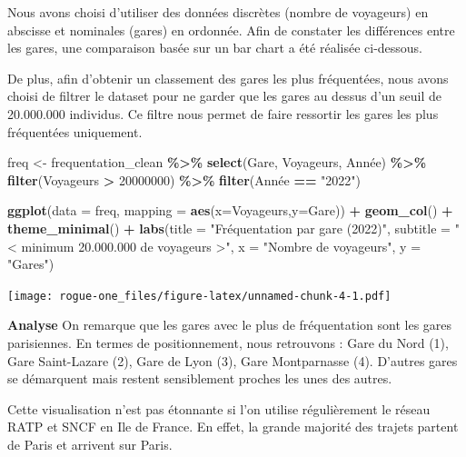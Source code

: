 \documentclass[
]{article}
\newenvironment{Shaded}{\begin{snugshade}}{\end{snugshade}}
\newcommand{\AttributeTok}[1]{\textcolor[rgb]{0.13,0.29,0.53}{#1}}
\newcommand{\DecValTok}[1]{\textcolor[rgb]{0.00,0.00,0.81}{#1}}
\newcommand{\FunctionTok}[1]{\textcolor[rgb]{0.13,0.29,0.53}{\textbf{#1}}}
\newcommand{\NormalTok}[1]{#1}
\newcommand{\OtherTok}[1]{\textcolor[rgb]{0.56,0.35,0.01}{#1}}
\newcommand{\SpecialCharTok}[1]{\textcolor[rgb]{0.81,0.36,0.00}{\textbf{#1}}}
\newcommand{\StringTok}[1]{\textcolor[rgb]{0.31,0.60,0.02}{#1}}
\begin{document}
Nous avons choisi d'utiliser des données discrètes (nombre de voyageurs)
en abscisse et nominales (gares) en ordonnée. Afin de constater les
différences entre les gares, une comparaison basée sur un bar chart a
été réalisée ci-dessous.

De plus, afin d'obtenir un classement des gares les plus fréquentées,
nous avons choisi de filtrer le dataset pour ne garder que les gares au
dessus d'un seuil de 20.000.000 individus. Ce filtre nous permet de
faire ressortir les gares les plus fréquentées uniquement.

\begin{Shaded}
\begin{Highlighting}[]
\NormalTok{freq }\OtherTok{\textless{}{-}}\NormalTok{ frequentation\_clean }\SpecialCharTok{\%\textgreater{}\%}
  \FunctionTok{select}\NormalTok{(Gare, Voyageurs, Année) }\SpecialCharTok{\%\textgreater{}\%}
  \FunctionTok{filter}\NormalTok{(Voyageurs }\SpecialCharTok{\textgreater{}} \DecValTok{20000000}\NormalTok{) }\SpecialCharTok{\%\textgreater{}\%}
  \FunctionTok{filter}\NormalTok{(Année }\SpecialCharTok{==} \StringTok{"2022"}\NormalTok{)}

\FunctionTok{ggplot}\NormalTok{(}\AttributeTok{data =}\NormalTok{ freq, }\AttributeTok{mapping =} \FunctionTok{aes}\NormalTok{(}\AttributeTok{x=}\NormalTok{Voyageurs,}\AttributeTok{y=}\NormalTok{Gare)) }\SpecialCharTok{+}
  \FunctionTok{geom\_col}\NormalTok{() }\SpecialCharTok{+}
  \FunctionTok{theme\_minimal}\NormalTok{() }\SpecialCharTok{+}
  \FunctionTok{labs}\NormalTok{(}\AttributeTok{title =} \StringTok{"Fréquentation par gare (2022)"}\NormalTok{,}
       \AttributeTok{subtitle =} \StringTok{"\textless{} minimum 20.000.000 de voyageurs \textgreater{}"}\NormalTok{,}
       \AttributeTok{x =} \StringTok{"Nombre de voyageurs"}\NormalTok{,}
       \AttributeTok{y =} \StringTok{"Gares"}\NormalTok{)}
\end{Highlighting}
\end{Shaded}

\texttt{[image: rogue-one\_files/figure-latex/unnamed-chunk-4-1.pdf]}

\textbf{Analyse} On remarque que les gares avec le plus de fréquentation
sont les gares parisiennes. En termes de positionnement, nous retrouvons
: Gare du Nord (1), Gare Saint-Lazare (2), Gare de Lyon (3), Gare
Montparnasse (4). D'autres gares se démarquent mais restent sensiblement
proches les unes des autres.

Cette visualisation n'est pas étonnante si l'on utilise régulièrement le
réseau RATP et SNCF en Ile de France. En effet, la grande majorité des
trajets partent de Paris et arrivent sur Paris.
\end{document}
